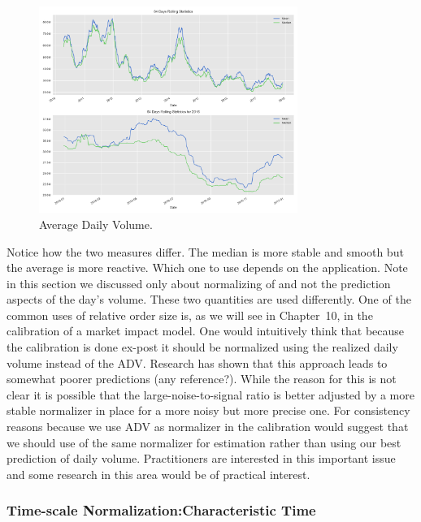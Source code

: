 	\begin{figure}[!ht]
		\centering
			\includegraphics[width=0.75\textwidth]{chapters/chapter_trade_data_models/figures/adv.png} 
		\caption{Average Daily Volume.\label{fig:adv}}
	\end{figure}
Notice how the two measures differ. The median is more stable and smooth but the average is more reactive. Which one to use depends on the application. Note in this section we discussed only about normalizing of and not the prediction aspects of the day's volume. These two quantities are used differently. One of the common uses of relative order size is, as we will see in Chapter~10, in the calibration of a market impact model. One would intuitively think that because the calibration is done ex-post it should be normalized using the realized daily volume instead of the ADV. Research has shown that this approach leads to somewhat poorer predictions (any reference?). While the reason for this is not clear it is possible that the large-noise-to-signal ratio is better adjusted by a more stable normalizer in place for a more noisy but more precise one. For consistency reasons because we use ADV as normalizer in the calibration would suggest that we should use of the same normalizer for estimation rather than using our best prediction of daily volume. Practitioners are interested in this important issue and some research in this area would be of practical interest. 


\subsubsection{Time-scale Normalization:Characteristic Time}

